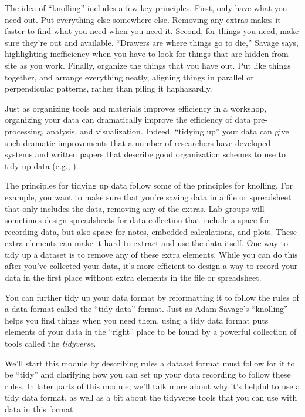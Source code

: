 \documentclass[]{tufte-book}
\begin{document}
The idea of ``knolling'' includes a few key principles. First, only have what you
need out. Put everything else somewhere else. Removing any extras makes it
faster to find what you need when you need it. Second, for things you need, make
sure they're out and available. ``Drawers are where things go to die,'' Savage
says, highlighting inefficiency when you have to look
for things that are hidden from site as you work. Finally, organize the things
that you have out. Put like things together, and arrange everything neatly,
aligning things in parallel or perpendicular patterns, rather than piling it
haphazardly.

Just as organizing tools and materials improves efficiency in a workshop,
organizing your data can dramatically improve the efficiency of data
pre-processing, analysis, and visualization. Indeed, ``tidying up'' your data
can give such dramatic improvements that a number of researchers have
developed systems and written papers that describe good organization schemes
to use to tidy up data (e.g., \citep{wickham2014tidy}).

The principles for tidying up data follow some of the principles for knolling.
For example, you want to make sure that you're saving data in a file or
spreadsheet that only includes the data, removing any of the extras. Lab groups
will sometimes design spreadsheets for data collection that include a space for
recording data, but also space for notes, embedded calculations, and plots.
These extra elements can make it hard to extract and use the data itself. One
way to tidy up a dataset is to remove any of these extra elements. While you can
do this after you've collected your data, it's more efficient to design a way to
record your data in the first place without extra elements in the file or
spreadsheet.

You can further tidy up your data format by reformatting it to
follow the rules of a data format called the ``tidy data'' format. Just as
Adam Savage's ``knolling'' helps you find things when you need them, using
a tidy data format puts elements of your data in the ``right'' place to be
found by a powerful collection of tools called the \emph{tidyverse}.

We'll start this module by describing rules a dataset format must follow for it
to be ``tidy'' and clarifying how you can set up your data recording to follow
these rules. In later parts of this module, we'll talk more about why it's
helpful to use a tidy data format, as well as a bit about the tidyverse tools
that you can use with data in this format.
\end{document}
